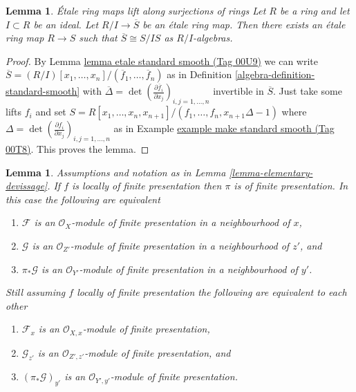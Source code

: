 \documentclass{amsart}
\newenvironment{slogan}{\comment}{\endcomment}
\theoremstyle{plain}
\newtheorem{lemma}[subsection]{Lemma}
\theoremstyle{definition}
\theoremstyle{remark}
\numberwithin{equation}{subsection}
\begin{document}
\begin{lemma}
\label{algebra-lemma-lift-etale}
\begin{slogan}
\'Etale ring maps lift along surjections of rings
\end{slogan}
Let $R$ be a ring and let $I \subset R$ be an ideal.
Let $R/I \to \overline{S}$ be an \'etale ring map.
Then there exists an \'etale ring map
$R \to S$ such that $\overline{S} \cong S/IS$ as $R/I$-algebras.
\end{lemma}

\begin{proof}
By Lemma \href{https://stacks.math.columbia.edu/tag/00U9}{lemma etale standard smooth (Tag 00U9)} we can write
$\overline{S} =
(R/I)[x_1, \ldots, x_n]/(\overline{f}_1, \ldots, \overline{f}_n)$
as in Definition \ref{algebra-definition-standard-smooth} with
$\overline{\Delta} =
\det(\frac{\partial \overline{f}_i}{\partial x_j})_{i, j = 1, \ldots, n}$
invertible in $\overline{S}$. Just take some lifts $f_i$ and set
$S = R[x_1, \ldots, x_n, x_{n+1}]/(f_1, \ldots, f_n, x_{n + 1}\Delta - 1)$
where $\Delta = \det(\frac{\partial f_i}{\partial x_j})_{i, j = 1, \ldots, n}$
as in Example \href{https://stacks.math.columbia.edu/tag/00T8}{example make standard smooth (Tag 00T8)}.
This proves the lemma.
\end{proof}


\begin{lemma}
\label{lemma-devissage-finite-presentation}
Assumptions and notation as in
Lemma \ref{lemma-elementary-devissage}.
If $f$ is locally of finite presentation
then $\pi$ is of finite presentation.
In this case the following are equivalent
\begin{enumerate}
\item $\mathcal{F}$ is an $\mathcal{O}_X$-module of finite presentation
in a neighbourhood of $x$,
\item $\mathcal{G}$ is an $\mathcal{O}_{Z'}$-module of finite presentation
in a neighbourhood of $z'$, and
\item $\pi_*\mathcal{G}$ is an $\mathcal{O}_{Y'}$-module of
finite presentation in a neighbourhood of $y'$.
\end{enumerate}
Still assuming $f$ locally of finite presentation the following are
equivalent to each other
\begin{enumerate}
\item[(a)] $\mathcal{F}_x$ is an $\mathcal{O}_{X, x}$-module of finite
presentation,
\item[(b)] $\mathcal{G}_{z'}$ is an $\mathcal{O}_{Z', z'}$-module of
finite presentation, and
\item[(c)] $(\pi_*\mathcal{G})_{y'}$ is an $\mathcal{O}_{Y', y'}$-module
of finite presentation.
\end{enumerate}
\end{lemma}
\end{document}
